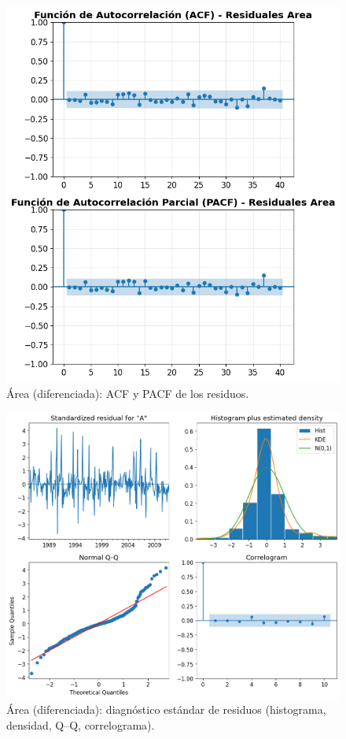 \begin{figure}[H]\centering
\includegraphics[scale=.52]{Figures/acf_pacf_res_area_d.png}
\caption{Área (diferenciada): ACF y PACF de los residuos.}
\label{fig:acf_pacf_res_area_d}
\end{figure}

\begin{figure}[H]\centering
\includegraphics[scale=.52]{Figures/res_std_area_d.png}
\caption{Área (diferenciada): diagnóstico estándar de residuos (histograma, densidad, Q--Q, correlograma).}
\label{fig:std_area_d}
\end{figure}

